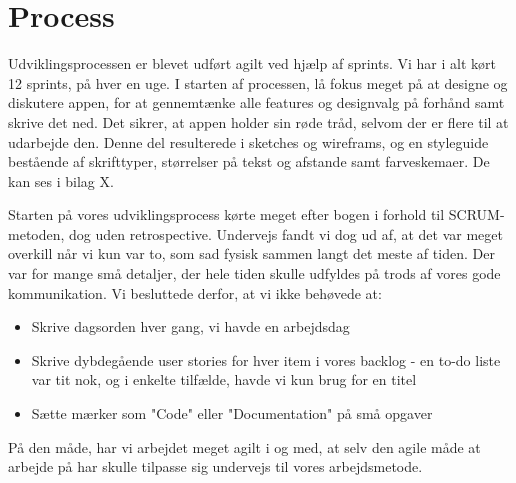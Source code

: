 \section{Process}
Udviklingsprocessen er blevet udført agilt ved hjælp af sprints. Vi har i alt kørt 12 sprints, på hver en uge. I starten af processen, lå fokus meget på at designe og diskutere appen, for at gennemtænke alle features og designvalg på forhånd samt skrive det ned. Det sikrer, at appen holder sin røde tråd, selvom der er flere til at udarbejde den. Denne del resulterede i sketches og wireframs, og en styleguide bestående af skrifttyper, størrelser på tekst og afstande samt farveskemaer. De kan ses i bilag X.

Starten på vores udviklingsprocess kørte meget efter bogen i forhold til SCRUM-metoden, dog uden retrospective. Undervejs fandt vi dog ud af, at det var meget overkill når vi kun var to, som sad fysisk sammen langt det meste af tiden. Der var for mange små detaljer, der hele tiden skulle udfyldes på trods af vores gode kommunikation. Vi besluttede derfor, at vi ikke behøvede at:

\begin{itemize}
   \item Skrive dagsorden hver gang, vi havde en arbejdsdag
   \item Skrive dybdegående user stories for hver item i vores backlog - en to-do liste var tit nok, og i enkelte tilfælde, havde vi kun brug for en titel
   \item Sætte mærker som "Code" eller "Documentation" på små opgaver
\end{itemize}

På den måde, har vi arbejdet meget agilt i og med, at selv den agile måde at arbejde på har skulle tilpasse sig undervejs til vores arbejdsmetode.

